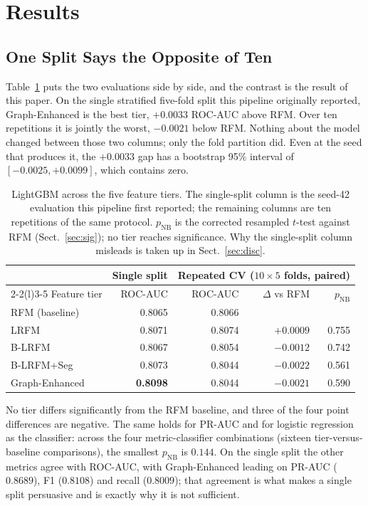 \documentclass[runningheads]{llncs}
\begin{document}
\section{Results}
\label{sec:results}

\subsection{One Split Says the Opposite of Ten}
\label{sec:onesplit}

Table~\ref{tab:main} puts the two evaluations side by side, and the contrast is
the result of this paper. On the single stratified five-fold split this pipeline
originally reported, Graph-Enhanced is the best tier, $+0.0033$ ROC-AUC above
RFM. Over ten repetitions it is jointly the worst, $-0.0021$ below RFM. Nothing
about the model changed between those two columns; only the fold partition did. Even at the
seed that produces it, the $+0.0033$ gap has a bootstrap 95\% interval of
$[-0.0025, +0.0099]$, which contains zero.

\begin{table}[t]
\centering
\caption{LightGBM across the five feature tiers. The single-split column is the
seed-42 evaluation this pipeline first reported; the remaining columns are ten
repetitions of the same protocol. $p_{\mathrm{NB}}$ is the corrected resampled
$t$-test against RFM (Sect.~\ref{sec:sig}); no tier reaches significance.
Why the single-split column misleads is taken up in Sect.~\ref{sec:disc}.}
\label{tab:main}
\setlength{\tabcolsep}{9pt}
\begin{tabular}{lrrrr}
\toprule
 & Single split & \multicolumn{3}{c}{Repeated CV ($10 \times 5$ folds, paired)} \\
\cmidrule(lr){2-2}\cmidrule(l){3-5}
Feature tier & ROC-AUC & ROC-AUC & $\Delta$ vs RFM & $p_{\mathrm{NB}}$ \\
\midrule
RFM (baseline) & 0.8065 & 0.8066 & & \\
LRFM & 0.8071 & 0.8074 & $+0.0009$ & 0.755 \\
B-LRFM & 0.8067 & 0.8054 & $-0.0012$ & 0.742 \\
B-LRFM+Seg & 0.8073 & 0.8044 & $-0.0022$ & 0.561 \\
Graph-Enhanced & \textbf{0.8098} & 0.8044 & $-0.0021$ & 0.590 \\
\bottomrule
\end{tabular}
\end{table}

No tier differs significantly from the RFM baseline, and three of the four point
differences are negative. The same holds for PR-AUC and for logistic regression
as the classifier: across the four metric-classifier combinations (sixteen
tier-versus-baseline comparisons), the smallest $p_{\mathrm{NB}}$ is $0.144$. On
the single split the other metrics agree with ROC-AUC, with Graph-Enhanced
leading on PR-AUC ($0.8689$), F1 ($0.8108$) and recall ($0.8009$); that agreement
is what makes a single split persuasive and is exactly why it is not sufficient.
\end{document}
